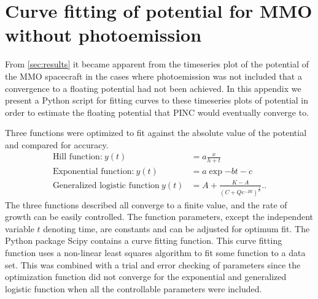 \chapter{Curve fitting of potential for MMO without photoemission}
\label{sec:appendixC}
\newenvironment{longlisting}{\captionsetup{type=listing}}{}

From \cref{sec:results} it became apparent from the timeseries plot of the potential of the MMO spacecraft in the cases where photoemission was not included that a convergence to a floating potential had not been achieved. In this appendix we present a Python script for fitting curves to these timeseries plots of potential in order to estimate the floating potential that PINC would eventually converge to.

Three functions were optimized to fit against the absolute value of the potential and compared for accuracy.
\begin{subequations}
    \begin{align}
        \text{Hill function:} \: y(t) &= a \frac{x}{h + t}\label{eq:Hill} \\
        \text{Exponential function:} \: y(t) &= a \exp{-b t} - c \label{eq:expFit} \\
        \text{Generalized logistic function} \: y(t) &=  A + \frac{K - A}{\left(C + Q e^{-B t}\right)^{\frac{1}{\nu}}}.\label{eq:genLog}.
    \end{align}
\end{subequations}
The three functions described all converge to a finite value, and the rate of growth can be easily controlled. The function parameters, except the independent variable $t$ denoting time, are constants and can be adjusted for optimum fit. The Python package Scipy contains a curve fitting function. This curve fitting function uses a non-linear least squares algorithm to fit some function to a data set. This was combined with a trial and error checking of parameters since the optimization function did not converge for the exponential and generalized logistic function when all the controllable parameters were included. 

